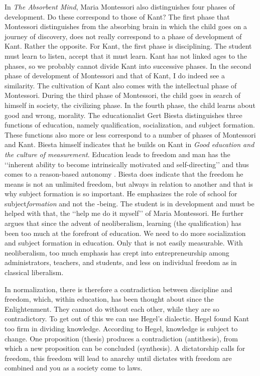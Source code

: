 \documentclass[12pt, a4paper]{article}
\begin{document}
In \emph{The Absorbent Mind}, Maria Montessori also distinguishes four phases of development. Do these correspond to those of Kant? The first phase that Montessori distinguishes from the absorbing brain in which the child goes on a journey of discovery, does not really correspond to a phase of development of Kant. Rather the opposite. For Kant, the first phase is disciplining. The student must learn to listen, accept that it must learn. Kant has not linked ages to the phases, so we probably cannot divide Kant into successive phases. In the second phase of development of Montessori and that of Kant, I do indeed see a similarity. The cultivation of Kant also comes with the intellectual phase of Montessori. During the third phase of Montessori, the child goes in search of himself in society, the civilizing phase. In the fourth phase, the child learns about good and wrong, morality. The educationalist Gert Biesta distinguishes three functions of education, namely qualification, socialization, and subject formation. These functions also more or less correspond to a number of phases of Montessori and Kant. Biesta himself indicates that he builds on Kant in \emph{Good education and the culture of measurement}. Education leads to freedom and man has the ‘‘inherent ability to become intrinsically motivated and self-directing’’ and thus comes to a reason-based autonomy \cite[p.77-79]{biesta}. Biesta does indicate that the freedom he means is not an unlimited freedom, but always in relation to another and that is why subject formation is so important. He emphasizes the role of school for subject\emph{formation} and not the -being. The student is in development and must be helped with that, the ‘‘help me do it myself’’ of Maria Montessori. He further argues that since the advent of neoliberalism, learning (the qualification) has been too much at the forefront of education. We need to do more socialization and subject formation in education. Only that is not easily measurable. With neoliberalism, too much emphasis has crept into entrepreneurship among administrators, teachers, and students, and less on individual freedom as in classical liberalism.

In normalization, there is therefore a contradiction between discipline and freedom, which, within education, has been thought about since the Enlightenment. They cannot do without each other, while they are so contradictory. To get out of this we can use Hegel’s dialectic. Hegel found Kant too firm in dividing knowledge. According to Hegel, knowledge is subject to change. One proposition (thesis) produces a contradiction (antithesis), from which a new proposition can be concluded (synthesis). A dictatorship calls for freedom, this freedom will lead to anarchy until dictates with freedom are combined and you as a society come to laws. \cite[p. 180-185]{buckingham}
\end{document}
